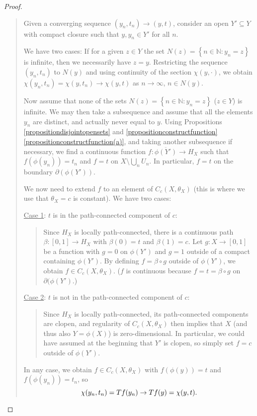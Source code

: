 \documentclass[letter,11pt]{amsart}
\theoremstyle{plain}		\newtheorem{theorem}[generalnumbering]{Theorem}
\theoremstyle{plain}		\newtheorem{corollary}[generalnumbering]{Corollary}
\theoremstyle{definition}		\newtheorem{definition}[generalnumbering]{Definition}
\theoremstyle{definition}		\newtheorem{example}[generalnumbering]{Example}
\theoremstyle{plain}		\newtheorem{proposition}[generalnumbering]{Proposition}
\theoremstyle{plain}		\newtheorem{lemma}[generalnumbering]{Lemma}
\theoremstyle{plain}    \newtheorem{plainstyle}[generalnumbering]{\namefordifferentenvironment}
\theoremstyle{plain}    \newtheorem*{plainstyle*}{\namefordifferentenvironment}
\theoremstyle{definition}    \newtheorem{definitionstyle}[generalnumbering]{\namefordifferentenvironment}
\theoremstyle{definition}    \newtheorem*{definitionstyle*}{\namefordifferentenvironment}
\begin{document}
\begin{proof}
\begin{quote}
		Given a converging sequence $(y_n,t_n)\to(y,t)$, consider an open $Y'\subseteq Y$ with compact closure such that $y,y_n\in Y'$ for all $n$.
		
		We have two cases: If for a given $z\in Y$ the set $N(z)=\left\{n\in\mathbb{N}:y_n=z\right\}$ is infinite, then we necessarily have $z=y$. Restricting the sequence $(y_n,t_n)$ to $N(y)$ and using continuity of the section $\chi(y,\cdot)$, we obtain $\chi(y_n,t_n)=\chi(y,t_n)\to \chi(y,t)$ as $n\to\infty$, $n\in N(y)$.
		
		Now assume that none of the sets $N(z)=\left\{n\in\mathbb{N}: y_n=z\right\}$ ($z\in Y$) is infinite. We may then take a subsequence and assume that all the elements $y_n$ are distinct, and actually never equal to $y$. Using Propositions \ref{propositiondisjointopensets} and \ref{propositionconstructfunction}\ref{propositionconstructfunction(a)}, and taking another subsequence if necessary, we find a continuous function $f\colon\overline{\phi(Y')}\to H_X$ such that $f(\phi(y_n))=t_n$ and $f=t$ on $X\setminus \bigcup_n U_n$. In particular, $f=t$ on the boundary $\partial(\phi(Y'))$.
		
		We now need to extend $f$ to an element of $C_c(X,\theta_X)$ (this is where we use that $\theta_X=c$ is constant). We have two cases:
		
			\uline{Case 1}: $t$ is in the path-connected component of $c$:
			\begin{quote}
			Since $H_X$ is locally path-connected, there is a continuous path $\beta\colon[0,1]\to H_X$ with $\beta(0)=t$ and $\beta(1)=c$. Let $g\colon X\to[0,1]$ be a function with $g=0$ on $\phi(Y')$ and $g=1$ outside of a compact containing $\phi(Y')$. By defining $f=\beta\circ g$ outside of $\phi(Y')$, we obtain $f\in C_c(X,\theta_X)$. ($f$ is continuous because $f=t=\beta\circ g$ on $\partial(\phi(Y')$.)
			\end{quote}
			
			\uline{Case 2}: $t$ is not in the path-connected component of $c$:
			\begin{quote}
			Since $H_X$ is locally path-connected, its path-connected components are clopen, and regularity of $C_c(X,\theta_X)$ then implies that $X$ (and thus also $Y=\phi(X)$) is zero-dimensional. In particular, we could have assumed at the beginning that $Y'$ is clopen, so simply set $f=c$ outside of $\phi(Y')$.
			\end{quote}
		
		In any case, we obtain $f\in C_c(X,\theta_X)$ with $f(\phi(y))=t$ and $f(\phi(y_n))=t_n$, so
		\[\chi(y_n,t_n)=Tf(y_n)\to Tf(y)=\chi(y,t).\qedhere\]
	\end{quote}
\end{proof}
\end{document}
